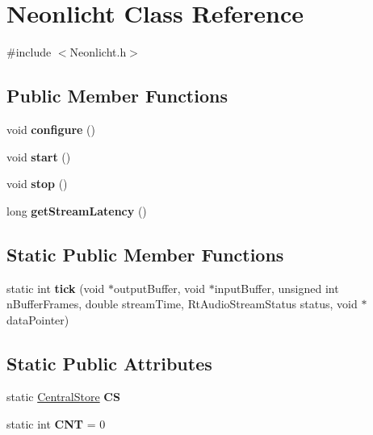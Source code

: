 \hypertarget{classNeonlicht}{}\section{Neonlicht Class Reference}
\label{classNeonlicht}


{\ttfamily \#include $<$Neonlicht.\+h$>$}

\subsection*{Public Member Functions}
\begin{DoxyCompactItemize}
\item 
void {\bfseries configure} ()\hypertarget{classNeonlicht_a32ec4c221148d01bbafd1637ced9b130}{}\label{classNeonlicht_a32ec4c221148d01bbafd1637ced9b130}

\item 
void {\bfseries start} ()\hypertarget{classNeonlicht_aae54e46be4d251ce4e062cd777994a69}{}\label{classNeonlicht_aae54e46be4d251ce4e062cd777994a69}

\item 
void {\bfseries stop} ()\hypertarget{classNeonlicht_a9d1f643b1a2394f9cd181149f7558c72}{}\label{classNeonlicht_a9d1f643b1a2394f9cd181149f7558c72}

\item 
long {\bfseries get\+Stream\+Latency} ()\hypertarget{classNeonlicht_a4354cc2fa6d7bd22e89d1314e375f54f}{}\label{classNeonlicht_a4354cc2fa6d7bd22e89d1314e375f54f}

\end{DoxyCompactItemize}
\subsection*{Static Public Member Functions}
\begin{DoxyCompactItemize}
\item 
static int {\bfseries tick} (void $\ast$output\+Buffer, void $\ast$input\+Buffer, unsigned int n\+Buffer\+Frames, double stream\+Time, Rt\+Audio\+Stream\+Status status, void $\ast$data\+Pointer)\hypertarget{classNeonlicht_a57c3e8d4154418c9efc4b48d45b732d6}{}\label{classNeonlicht_a57c3e8d4154418c9efc4b48d45b732d6}

\end{DoxyCompactItemize}
\subsection*{Static Public Attributes}
\begin{DoxyCompactItemize}
\item 
static \hyperlink{classCentralStore}{Central\+Store} {\bfseries CS}\hypertarget{classNeonlicht_a1ac3a31190125df3763a9f3d2f085d5e}{}\label{classNeonlicht_a1ac3a31190125df3763a9f3d2f085d5e}

\item 
static int {\bfseries C\+NT} = 0\hypertarget{classNeonlicht_ac86fbdabd4683feaac58b4aefbdf6695}{}\label{classNeonlicht_ac86fbdabd4683feaac58b4aefbdf6695}

\end{DoxyCompactItemize}


